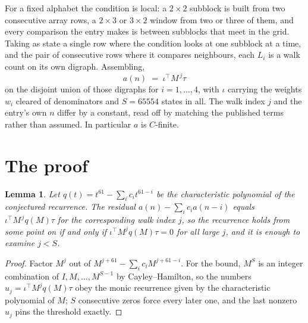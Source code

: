 \documentclass[11pt,a4paper]{article}
\theoremstyle{plain}
\newtheorem{lemma}[theorem]{Lemma}
\theoremstyle{definition}
\begin{document}
For a fixed alphabet the condition is local: a $2\times2$ subblock is built from two
consecutive array rows, a $2\times3$ or $3\times2$ window from two or three of them, and every
comparison the entry makes is between subblocks that meet in the grid. Taking as state a single
row where the condition looks at one subblock at a time, and the pair of consecutive rows where
it compares neighbours, each $L_i$ is a walk count on its own digraph. Assembling,
\[
a(n)\;=\;\iota^{\!\top}M^{\,j}\tau
\]
on the disjoint union of those digraphs for $i=1,\dots,4$, with $\iota$ carrying the weights
$w_i$ cleared of denominators and $S=65554$ states in all. The walk index $j$ and the entry's own
$n$ differ by a constant, read off by matching the published terms rather than assumed. In
particular $a$ is $C$-finite.

\section{The proof}

\begin{lemma}\label{lem:crit}
Let $q(t)=t^{61}-\sum_i c_it^{61-i}$ be the characteristic polynomial of the
conjectured recurrence. The residual $a(n)-\sum_ic_ia(n-i)$ equals
$\iota^{\!\top}M^{\,j}q(M)\tau$ for the corresponding walk index $j$, so the recurrence
holds from some point on if and only if $\iota^{\!\top}M^{j}q(M)\tau=0$ for all large $j$,
and it is enough to examine $j<S$.
\end{lemma}

\begin{proof}
Factor $M^{j}$ out of $M^{j+61}-\sum_ic_iM^{j+61-i}$. For the bound, $M^{S}$
is an integer combination of $I,M,\dots,M^{S-1}$ by Cayley--Hamilton, so the numbers
$u_j=\iota^{\!\top}M^{j}q(M)\tau$ obey the monic recurrence given by the characteristic
polynomial of $M$; $S$ consecutive zeros force every later one, and the last nonzero $u_j$
pins the threshold exactly.
\end{proof}
\end{document}
